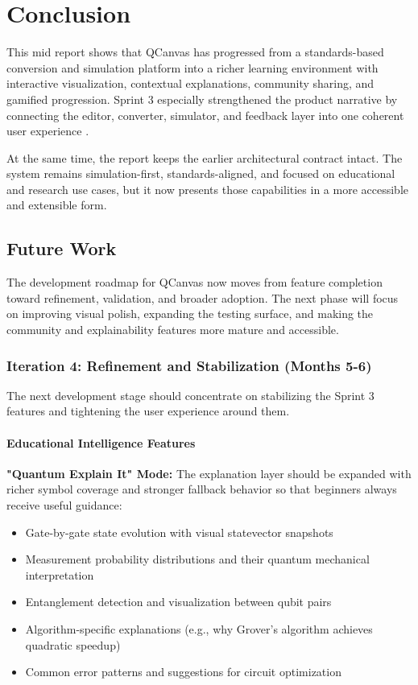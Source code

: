 \chapter{Conclusion}

This mid report shows that QCanvas has progressed from a standards-based conversion and simulation platform into a richer learning environment with interactive visualization, contextual explanations, community sharing, and gamified progression. Sprint 3 especially strengthened the product narrative by connecting the editor, converter, simulator, and feedback layer into one coherent user experience \cite{cross2021openqasm}.

At the same time, the report keeps the earlier architectural contract intact. The system remains simulation-first, standards-aligned, and focused on educational and research use cases, but it now presents those capabilities in a more accessible and extensible form.

\section{Future Work}

The development roadmap for QCanvas now moves from feature completion toward refinement, validation, and broader adoption. The next phase will focus on improving visual polish, expanding the testing surface, and making the community and explainability features more mature and accessible.

\subsection{Iteration 4: Refinement and Stabilization (Months 5-6)}

The next development stage should concentrate on stabilizing the Sprint 3 features and tightening the user experience around them.

\subsubsection{Educational Intelligence Features}

\textbf{"Quantum Explain It" Mode:} The explanation layer should be expanded with richer symbol coverage and stronger fallback behavior so that beginners always receive useful guidance:
\begin{itemize}
    \item Gate-by-gate state evolution with visual statevector snapshots
    \item Measurement probability distributions and their quantum mechanical interpretation
    \item Entanglement detection and visualization between qubit pairs
    \item Algorithm-specific explanations (e.g., why Grover's algorithm achieves quadratic speedup)
    \item Common error patterns and suggestions for circuit optimization
\end{itemize}

